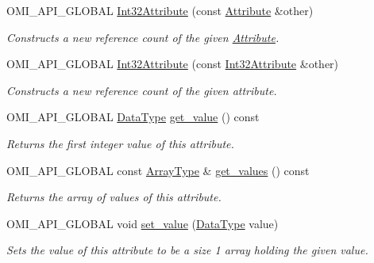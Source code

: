 \begin{DoxyCompactItemize}
\item 
O\+M\+I\+\_\+\+A\+P\+I\+\_\+\+G\+L\+O\+B\+AL \hyperlink{classomi_1_1_int32_attribute_a6c21c2c18daeebed6391be7995cc3d79}{Int32\+Attribute} (const \hyperlink{classomi_1_1_attribute}{Attribute} \&other)
\begin{DoxyCompactList}\small\item\em Constructs a new reference count of the given \hyperlink{classomi_1_1_attribute}{Attribute}. \end{DoxyCompactList}\item 
O\+M\+I\+\_\+\+A\+P\+I\+\_\+\+G\+L\+O\+B\+AL \hyperlink{classomi_1_1_int32_attribute_a93e4103db7d56ca756d54a74bbb15c3c}{Int32\+Attribute} (const \hyperlink{classomi_1_1_int32_attribute}{Int32\+Attribute} \&other)
\begin{DoxyCompactList}\small\item\em Constructs a new reference count of the given attribute. \end{DoxyCompactList}\item 
O\+M\+I\+\_\+\+A\+P\+I\+\_\+\+G\+L\+O\+B\+AL \hyperlink{classomi_1_1_int32_attribute_aaafef3adcf9a0111695451449dfa1a2d}{Data\+Type} \hyperlink{classomi_1_1_int32_attribute_af82dc5de2c62769fa8e26c7350439c1a}{get\+\_\+value} () const 
\begin{DoxyCompactList}\small\item\em Returns the first integer value of this attribute. \end{DoxyCompactList}\item 
O\+M\+I\+\_\+\+A\+P\+I\+\_\+\+G\+L\+O\+B\+AL const \hyperlink{classomi_1_1_int32_attribute_a09ae7167f71512dc47ef34d96bf3baf5}{Array\+Type} \& \hyperlink{classomi_1_1_int32_attribute_adeaec7b2ca620a28155f0c18e25a0fed}{get\+\_\+values} () const 
\begin{DoxyCompactList}\small\item\em Returns the array of values of this attribute. \end{DoxyCompactList}\item 
O\+M\+I\+\_\+\+A\+P\+I\+\_\+\+G\+L\+O\+B\+AL void \hyperlink{classomi_1_1_int32_attribute_afae23b709686441ca374a25c09d124db}{set\+\_\+value} (\hyperlink{classomi_1_1_int32_attribute_aaafef3adcf9a0111695451449dfa1a2d}{Data\+Type} value)
\begin{DoxyCompactList}\small\item\em Sets the value of this attribute to be a size 1 array holding the given value. \end{DoxyCompactList}\item 

\end{DoxyCompactItemize}
